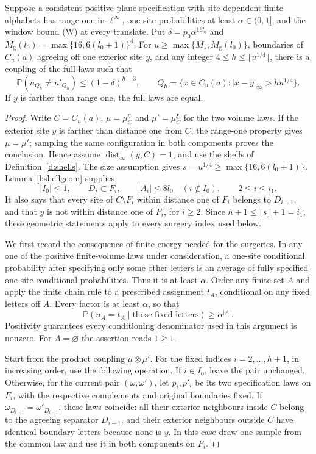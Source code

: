 \begin{lemma}\label{l:stopped}
Suppose a consistent positive plane specification with site-dependent
finite alphabets has range one in \(\ell^\infty\), one-site probabilities
at least \(\alpha\in(0,1]\), and the window bound (W) at every translate.
Put \(\delta=p_0\alpha^{16l_0}\) and
\(M_{\mathrm g}(l_0)=\max\{16,6(l_0+1)\}^4\).
For \(u\ge\max\{M_\star,M_{\mathrm g}(l_0)\}\), boundaries of \(C_u(a)\)
agreeing off one exterior site \(y\), and any integer
\(4\le h\le\lfloor u^{1/4}\rfloor\), there is a coupling of the
full laws such that
\[
 \mathbb P(n_{Q_h}\ne n'_{Q_h})\le(1-\delta)^{h-3},
 \qquad Q_h=\{x\in C_u(a):|x-y|_\infty>hu^{1/4}\}.
\]
If \(y\) is farther than range one, the full laws are equal.
\end{lemma}

\begin{proof}
Write \(C=C_u(a)\), \(\mu=\mu_C^\eta\) and
\(\mu'=\mu_C^\xi\) for the two volume laws.  If the exterior site
\(y\) is farther than distance one from \(C\), the range-one property
gives \(\mu=\mu'\); sampling the same configuration in both
components proves the conclusion.  Hence assume
\(\operatorname{dist}_\infty(y,C)=1\), and use the shells of
Definition~\ref{d:shells}.  The size assumption gives
\(s=u^{1/4}\ge\max\{16,6(l_0+1)\}\).
Lemma~\ref{l:shellgeom} supplies
\[
 |I_0|\le1,\qquad D_i\subset F_i,
 \qquad |A_i|\le8l_0\quad(i\notin I_0),
 \qquad 2\le i\le i_1.
\]
It also says that every site of \(C\setminus F_i\) within distance
one of \(F_i\) belongs to \(D_{i-1}\), and that \(y\) is not
within distance one of \(F_i\), for \(i\ge2\).
Since \(h+1\le\lfloor s\rfloor+1=i_1\), these geometric statements
apply to every surgery index used below.

We first record the consequence of finite energy needed for the
surgeries.  In any one of the positive finite-volume laws under
consideration, a one-site conditional probability after specifying
only some other letters is an average of fully specified one-site
conditional probabilities.  Thus it is at least \(\alpha\).
Order any finite set \(A\) and apply the finite chain rule to a
prescribed assignment \(t_A\), conditional on any fixed letters off
\(A\).  Every factor is at least \(\alpha\), so that
\[
 \mathbb P(n_A=t_A\mid\text{those fixed letters})
                      \ge\alpha^{|A|}.
\]
Positivity guarantees every conditioning denominator used in this
argument is nonzero.  For \(A=\varnothing\) the assertion reads
\(1\ge1\).

Start from the product coupling \(\mu\otimes\mu'\).  For the fixed
indices \(i=2,\ldots,h+1\), in increasing order, use the following
operation.  If \(i\in I_0\), leave the pair unchanged.  Otherwise,
for the current pair \((\omega,\omega')\), let \(p_i,p'_i\) be its
two specification laws on \(F_i\), with the respective complements
and original boundaries fixed.  If
\(\omega_{D_{i-1}}=\omega'_{D_{i-1}}\), these laws coincide:
all their exterior neighbours inside \(C\) belong to the agreeing
separator \(D_{i-1}\), and their exterior neighbours outside \(C\)
have identical boundary letters because none is \(y\).  In this
case draw one sample from the common law and use it in both components
on \(F_i\).


\end{proof}
